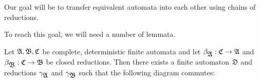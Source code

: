 Our goal will be to transfer equivalent automata into each other using chains of
reductions.

To reach this goal, we will need a number of lemmata.

\begin{lemma}
Let $\mbox{$\mathfrak{A}$}, \mbox{$\mathfrak{B}$}, \mbox{$\mathfrak{C}$}$ be complete, deterministic finite automata and let
$\beta_{\mbox{$\mathfrak{A}$}} : \mbox{$\mathfrak{C}$} \to \mbox{$\mathfrak{A}$}$ and $\beta_{\mbox{$\mathfrak{B}$}} : \mbox{$\mathfrak{C}$} \to \mbox{$\mathfrak{B}$}$ be
closed reductions. Then there exists a finite automaton $\mbox{$\mathfrak{D}$}$ and reductions
$\gamma_{\mbox{$\mathfrak{A}$}}$ and $\gamma_{\mbox{$\mathfrak{B}$}}$ such that the following diagram
commutes:

\begin{center}
\end{center}
\end{lemma}

